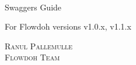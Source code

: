 \begin{titlepage}
    \center
    \HRule \\[0.4cm]
    \fontsize{35.83}{40}\selectfont Swaggers Guide \par 
    { \Large  For Flowdoh versions v1.0.x, v1.1.x }
    \HRule \\[0.5cm]
    \begin{spacing}{2.0}
        \textsc{\Large Ranul Pallemulle}\\ [0.0cm]
        \textsc{\large Flowdoh Team}\\[2cm]
    \end{spacing}
    \vfill
\end{titlepage}